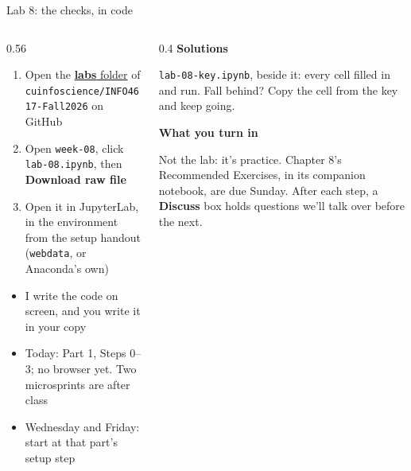 \documentclass[9pt,aspectratio=169]{beamer}
\begin{document}
\begin{frame}{Lab 8: the checks, in code}
    \begin{columns}[T]
        \begin{column}{0.56\textwidth}
            \begin{enumerate}\small
                \item Open the \href{https://github.com/cuinfoscience/INFO4617-Fall2026/tree/main/labs}{\textbf{labs} folder} of \texttt{cuinfoscience/INFO4617-Fall2026} on GitHub
                \item Open \texttt{week-08}, click \texttt{lab-08.ipynb}, then \textbf{Download raw file}
                \item Open it in JupyterLab, in the environment from the setup handout (\texttt{webdata}, or Anaconda's own)
            \end{enumerate}

            \medskip
            \begin{itemize}\small
                \item I write the code on screen, and you write it in your copy
                \item Today: Part 1, Steps 0--3; no browser yet. Two microsprints are after class
                \item Wednesday and Friday: start at that part's setup step
            \end{itemize}
        \end{column}
        \begin{column}{0.4\textwidth}
            \textbf{Solutions}\\[2pt]
            {\footnotesize \texttt{lab-08-key.ipynb}, beside it: every cell filled in and run. Fall behind? Copy the cell from the key and keep going.\par}
            \medskip
            \textbf{What you turn in}\\[2pt]
            {\footnotesize Not the lab: it's practice. Chapter 8's Recommended Exercises, in its companion notebook, are due Sunday. After each step, a \textbf{Discuss} box holds questions we'll talk over before the next.\par}
        \end{column}
    \end{columns}
\end{frame}
\end{document}
